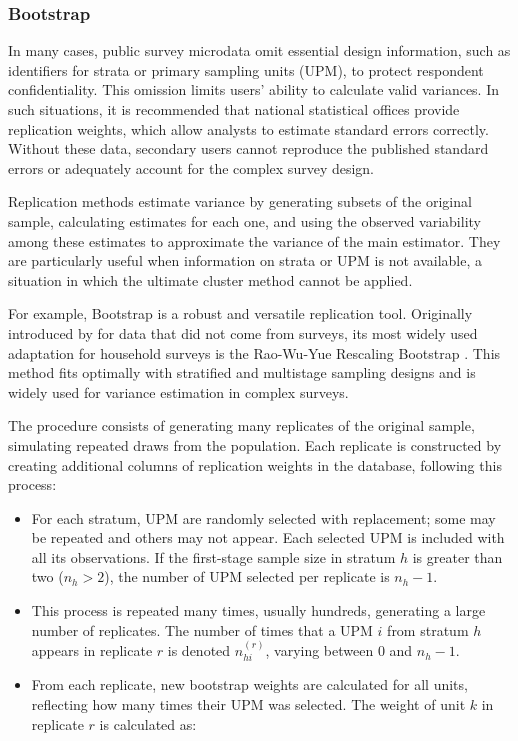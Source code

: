 \documentclass[
  english,
  12pt,
]{book}
\providecommand{\tightlist}{%
  \setlength{\itemsep}{0pt}\setlength{\parskip}{0pt}}
\begin{document}
\subsubsection{Bootstrap}\label{bootstrap}

In many cases, public survey microdata omit essential design information, such as identifiers for strata or primary sampling units (UPM), to protect respondent confidentiality. This omission limits users' ability to calculate valid variances. In such situations, it is recommended that national statistical offices provide replication weights, which allow analysts to estimate standard errors correctly. Without these data, secondary users cannot reproduce the published standard errors or adequately account for the complex survey design.

Replication methods estimate variance by generating subsets of the original sample, calculating estimates for each one, and using the observed variability among these estimates to approximate the variance of the main estimator. They are particularly useful when information on strata or UPM is not available, a situation in which the ultimate cluster method cannot be applied.

For example, Bootstrap is a robust and versatile replication tool. Originally introduced by \citet{efron1979bootstrap} for data that did not come from surveys, its most widely used adaptation for household surveys is the Rao-Wu-Yue Rescaling Bootstrap \citep{rao1992resampling}. This method fits optimally with stratified and multistage sampling designs and is widely used for variance estimation in complex surveys.

The procedure consists of generating many replicates of the original sample, simulating repeated draws from the population. Each replicate is constructed by creating additional columns of replication weights in the database, following this process:

\begin{itemize}
\tightlist
\item
  For each stratum, UPM are randomly selected with replacement; some may be repeated and others may not appear. Each selected UPM is included with all its observations. If the first-stage sample size in stratum \(h\) is greater than two (\(n_h > 2\)), the number of UPM selected per replicate is \(n_h - 1\).
\item
  This process is repeated many times, usually hundreds, generating a large number of replicates. The number of times that a UPM \(i\) from stratum \(h\) appears in replicate \(r\) is denoted \(n_{hi}^{(r)}\), varying between 0 and \(n_h - 1\).
\item
  From each replicate, new bootstrap weights are calculated for all units, reflecting how many times their UPM was selected. The weight of unit \(k\) in replicate \(r\) is calculated as:
\end{itemize}
\end{document}
